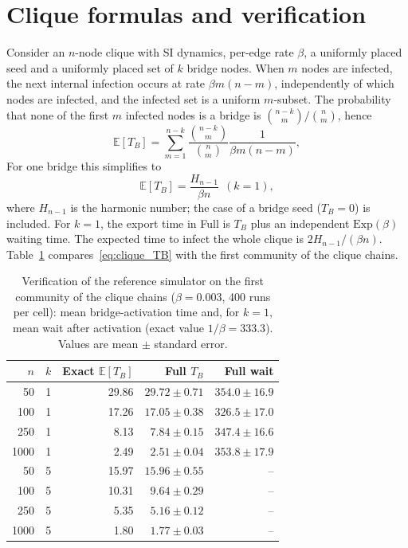 \documentclass{ieeeaccess}
\newcommand{\Exp}{\mathrm{Exp}}
\newcommand{\Full}{\textup{Full}}
\begin{document}
\section{Clique formulas and verification}
\label{app:clique}

Consider an $n$-node clique with SI dynamics, per-edge rate $\beta$, a uniformly placed seed and a uniformly placed set of $k$ bridge nodes. When $m$ nodes are infected, the next internal infection occurs at rate $\beta m(n-m)$, independently of which nodes are infected, and the infected set is a uniform $m$-subset. The probability that none of the first $m$ infected nodes is a bridge is $\binom{n-k}{m}/\binom{n}{m}$, hence
\begin{equation}
\label{eq:clique_TB}
\mathbb{E}[T_B]=\sum_{m=1}^{n-k}\frac{\binom{n-k}{m}}{\binom{n}{m}}\frac{1}{\beta m(n-m)},
\end{equation}
For one bridge this simplifies to
\begin{equation}
\mathbb{E}[T_B]=\frac{H_{n-1}}{\beta n}\ \ (k=1),
\end{equation}
where $H_{n-1}$ is the harmonic number; the case of a bridge seed ($T_B=0$) is included. For $k=1$, the export time in \Full{} is $T_B$ plus an independent $\Exp(\beta)$ waiting time. The expected time to infect the whole clique is $2H_{n-1}/(\beta n)$. Table~\ref{tab:verification} compares~\eqref{eq:clique_TB} with the first community of the clique chains.

\begin{table}[!htbp]
\centering
\caption{Verification of the reference simulator on the first community of the clique chains ($\beta=0.003$, 400 runs per cell): mean bridge-activation time and, for $k=1$, mean wait after activation (exact value $1/\beta=333.3$). Values are mean $\pm$ standard error.}
\label{tab:verification}
\small
\setlength{\tabcolsep}{3pt}
\begin{tabular}{rrrrr}
\toprule
$n$ & $k$ & Exact $\mathbb{E}[T_B]$ & \Full{} $T_B$ & \Full{} wait\\
\midrule
50 & 1 & 29.86 & $29.72\pm0.71$ & $354.0\pm16.9$\\
100 & 1 & 17.26 & $17.05\pm0.38$ & $326.5\pm17.0$\\
250 & 1 & 8.13 & $7.84\pm0.15$ & $347.4\pm16.6$\\
1000 & 1 & 2.49 & $2.51\pm0.04$ & $353.8\pm17.9$\\
50 & 5 & 15.97 & $15.96\pm0.55$ & --\\
100 & 5 & 10.31 & $9.64\pm0.29$ & --\\
250 & 5 & 5.35 & $5.16\pm0.12$ & --\\
1000 & 5 & 1.80 & $1.77\pm0.03$ & --\\
\bottomrule
\end{tabular}
\end{table}
\end{document}
